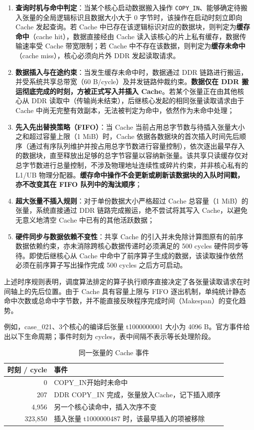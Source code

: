 \documentclass[anonymous,notoc]{gmcm2026}
\providecommand{\tightlist}{\setlength{\itemsep}{0pt}\setlength{\parskip}{0pt}}
\begin{document}
\begin{enumerate}
\def\labelenumi{\arabic{enumi}.}
\tightlist
\item
  \textbf{查询时机与命中判定}：当某个核心启动数据搬入操作 \texttt{COPY\_IN}、能够确定待搬入张量的全局逻辑标识且数据大小大于 0 字节时，该操作在启动时刻立即向 Cache 发起查询。若 Cache 中已存在该逻辑标识对应的数据块，则判定为\textbf{缓存命中}（cache hit），数据直接经由 Cache 读入该核心的片上私有缓存，数据传输速率受 Cache 带宽限制；若 Cache 中不存在该数据，则判定为\textbf{缓存未命中}（cache miss），核心必须向片外 DDR 发起读取请求。
\item
  \textbf{数据插入与在途约束}：当发生缓存未命中时，数据通过 DDR 链路进行搬运，并受系统共享总带宽（60 B/cycle）及并发链路仲裁约束。\textbf{数据仅在 DDR 搬运彻底完成的时刻，方被正式写入并插入 Cache}。若某个张量正在由其他核心从 DDR 读取中（传输尚未结束），后继核心发起的相同张量读取请求由于 Cache 中尚无完整有效副本，无法被判定为命中，依然作为未命中处理；
\item
  \textbf{先入先出替换策略（FIFO）}：当 Cache 当前占用总字节数与待插入张量大小之和超过容量上限（1 MiB）时，Cache 依据各数据块的首次插入时间先后顺序（通过有序队列维护并按占用总字节数进行容量控制），依次逐出最早存入的数据块，直至释放出足够的总字节容量以容纳新张量。该共享只读缓存仅对总字节数进行总量控制，不涉及物理地址连续性或碎片约束，并非核心私有的 L1/UB 物理分配器。\textbf{缓存命中操作不会更新或刷新该数据块的入队时间戳，亦不改变其在 FIFO 队列中的淘汰顺序}；
\item
  \textbf{超大张量不插入规则}：对于单份数据大小严格超过 Cache 总容量（1 MiB）的张量，系统直接通过 DDR 链路完成搬运，绝不尝试将其写入 Cache，以避免无意义地清空 Cache 中已有的其他活跃数据；
\item
  \textbf{硬件同步与数据依赖不变性}：共享 Cache 的引入并未免除计算图原有的前序数据依赖约束，亦未消除跨核心数据传递时必须满足的 500 cycles 硬件同步等待。即使后继核心从 Cache 中命中了前序算子生成的数据，该读取操作依然必须在前序算子写出操作完成 500 cycles 之后方可启动。
\end{enumerate}

上述时序规则表明，调度算法排定的算子执行顺序直接决定了各张量读取请求在时间轴上的先后位置。由于 Cache 具有容量上限与 FIFO 逐出机制，单纯统计静态命中次数或总命中字节数，并不能直接反映程序完成时间（Makespan）的变化趋势。

例如，case\_021、3个核心的编译后张量 t1000000001 大小为 4096 B。官方事件给出以下生命周期；事件时刻为 cycles，表中间隔不表示等长处理阶段。

\begin{table}[!htbp]\centering
\caption{同一张量的 Cache 事件}\label{tab:cache-events}
\begin{tabularx}{\linewidth}{rX}\toprule
时刻 / cycle & 事件 \\\midrule
0 & COPY\_IN开始时未命中 \\
207 & DDR COPY\_IN 完成，张量放入Cache，记下插入顺序 \\
4,956 & 另一个核心读命中，插入次序不变 \\
323,850 & 插入张量 t1000000487 时，该最早插入的项被移除 \\\bottomrule
\end{tabularx}\end{table}
\end{document}
